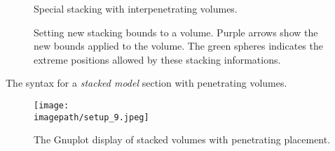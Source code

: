 \begin{figure}[h]
\begin{center}
\scalebox{0.75}{}
\end{center}
\caption{Special stacking with interpenetrating volumes.}\label{fig:stacked:1}
\end{figure}

\begin{figure}[h]
\begin{center}
\scalebox{0.75}{}
\end{center}
\caption{Setting new  stacking bounds to a volume.  Purple arrows show
  the new  bounds applied to  the volume. The green  spheres indicates
  the     extreme    positions     allowed     by    these     stacking
  informations.}\label{fig:stacked:2}
\end{figure}

\begin{sample}[h]
\caption{The syntax for a \emph{stacked model} section with penetrating volumes.}
\label{sample:stacked:1}
\end{sample}

\begin{figure}[h]
\begin{center}
\texttt{[image: \\imagepath/setup\_9.jpeg]}
\end{center}
\caption{The Gnuplot display of stacked volumes with penetrating placement.}
\label{fig:setup_9:0}
\end{figure}

